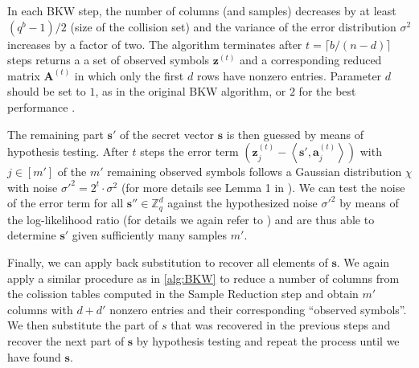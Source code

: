 In each BKW step, the number of columns (and samples) decreases by at least $(q^b - 1)/2$ (size of the collision set) and the variance of the error distribution $\sigma^2$ increases by a factor of two. The algorithm terminates after $t = \lceil b / (n - d)\rceil$ steps returns a a set of observed symbols $\mathbf{z}^{(t)}$ and a corresponding reduced matrix $\mathbf{A}^{(t)}$ in which only the first $d$ rows have nonzero entries. Parameter $d$ should be set to $1$, as in the original BKW algorithm, or $2$ for the best performance \cite{ACFFP15a}.

The remaining part $\mathbf{s}'$ of the secret vector $\mathbf{s}$ is then guessed by means of hypothesis testing. After $t$ steps the error term $\left(\mathbf{z}_j^{(t)} - \left\langle \mathbf{s}', \mathbf{a}_j^{(t)}\right\rangle\right)$ with $j \in [m']$ of the $m'$ remaining observed symbols follows a Gaussian distribution $\chi$ with noise $\sigma'^2 = 2^t\cdot \sigma^2$ (for more details see Lemma 1 in \cite{ACFFP15a}). %
We can test the noise of the error term for all $\mathbf{s}'' \in \mathbb{Z}_q^d$ against the hypothesized noise  $\sigma'^2$ by means of the log-likelihood ratio (for details we again refer to \cite{ACFFP15a}) and are thus able to determine $\mathbf{s}'$ given sufficiently many samples $m'$.


Finally, we can apply back substitution to recover all elements of $\mathbf{s}$. We again apply a similar procedure as in \cref{alg:BKW} to reduce a number of columns from the colission tables computed in the Sample Reduction step and obtain $m'$ columns with $d+d'$ nonzero entries and their corresponding ``observed symbols''. We then substitute the part of $s$ that was recovered in the previous steps and recover the next part of $\mathbf{s}$ by hypothesis testing and repeat the process until we have found $\mathbf{s}$.

